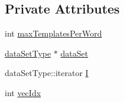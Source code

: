 \subsection*{Private Attributes}
\begin{DoxyCompactItemize}
\item 
int \hyperlink{class_wave_feature_o_p_set_1_1iterator_a94f22cdd6fcee7a6125b8b09f0384cb2}{max\+Templates\+Per\+Word}
\item 
\hyperlink{class_wave_feature_o_p_set_a7145e9463a1fb85ce4c239552bf4e8e0}{data\+Set\+Type} $\ast$ \hyperlink{class_wave_feature_o_p_set_1_1iterator_a3eb82b0712290fe15e135390a02150fa}{data\+Set}
\item 
data\+Set\+Type\+::iterator \hyperlink{class_wave_feature_o_p_set_1_1iterator_a20f89afc2f06d44b8aae87e33cc28ef6}{I}
\item 
int \hyperlink{class_wave_feature_o_p_set_1_1iterator_abf861ecdfdfb9474c1a55514d4854597}{vec\+Idx}
\end{DoxyCompactItemize}


